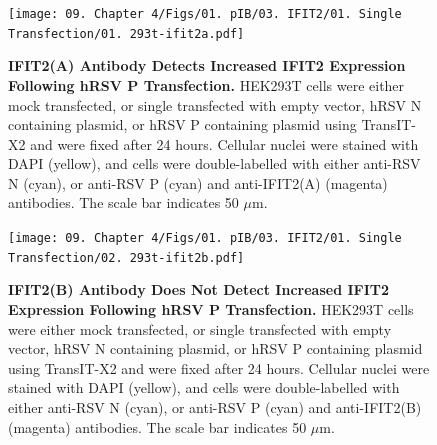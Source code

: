 \begin{figure}
    \centering
    \texttt{[image: 09. Chapter 4/Figs/01. pIB/03. IFIT2/01. Single Transfection/01. 293t-ifit2a.pdf]}
    \caption[IFIT2(A) Antibody Detects Increased IFIT2 Expression Following hRSV P Transfection.]{\textbf{IFIT2(A) Antibody Detects Increased IFIT2 Expression Following hRSV P Transfection.} HEK293T cells were either mock transfected, or single transfected with empty vector, hRSV N containing plasmid, or hRSV P containing plasmid using TransIT-X2 and were fixed after 24 hours. Cellular nuclei were stained with DAPI (yellow), and cells were double-labelled with either anti-RSV N (cyan), or anti-RSV P (cyan) and anti-IFIT2(A) (magenta) antibodies. The scale bar indicates 50 \(\mu \mbox{m}\).}
    \label{fig:IFIT2(A) Antibody Detects Increased IFIT2 Expression Following hRSV P Transfection}
\end{figure}

\begin{figure}
    \centering
    \texttt{[image: 09. Chapter 4/Figs/01. pIB/03. IFIT2/01. Single Transfection/02. 293t-ifit2b.pdf]}
    \caption[IFIT2(B) Antibody Does Not Detect Increased IFIT2 Expression Following hRSV P Transfection.]{\textbf{IFIT2(B) Antibody Does Not Detect Increased IFIT2 Expression Following hRSV P Transfection.} HEK293T cells were either mock transfected, or single transfected with empty vector, hRSV N containing plasmid, or hRSV P containing plasmid using TransIT-X2 and were fixed after 24 hours. Cellular nuclei were stained with DAPI (yellow), and cells were double-labelled with either anti-RSV N (cyan), or anti-RSV P (cyan) and anti-IFIT2(B) (magenta) antibodies. The scale bar indicates 50 \(\mu \mbox{m}\).}
    \label{fig:IFIT2(B) Antibody Does Not Detect Increased IFIT2 Expression Following hRSV P Transfection}
\end{figure}

